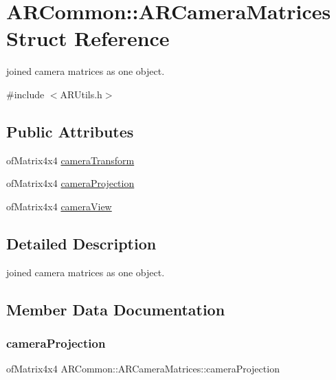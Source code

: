 \hypertarget{struct_a_r_common_1_1_a_r_camera_matrices}{}\section{A\+R\+Common\+:\+:A\+R\+Camera\+Matrices Struct Reference}
\label{struct_a_r_common_1_1_a_r_camera_matrices}


joined camera matrices as one object.  




{\ttfamily \#include $<$A\+R\+Utils.\+h$>$}

\subsection*{Public Attributes}
\begin{DoxyCompactItemize}
\item 
of\+Matrix4x4 \hyperlink{struct_a_r_common_1_1_a_r_camera_matrices_a704028e138238522f8e060d5d587b0ef}{camera\+Transform}
\item 
of\+Matrix4x4 \hyperlink{struct_a_r_common_1_1_a_r_camera_matrices_a5d0957360e888d95ae75358416dfe487}{camera\+Projection}
\item 
of\+Matrix4x4 \hyperlink{struct_a_r_common_1_1_a_r_camera_matrices_a0a6b9d23ece063831aac56c704d83d7f}{camera\+View}
\end{DoxyCompactItemize}


\subsection{Detailed Description}
joined camera matrices as one object. 

\subsection{Member Data Documentation}
\mbox{\label{struct_a_r_common_1_1_a_r_camera_matrices_a5d0957360e888d95ae75358416dfe487}} 
\subsubsection{\texorpdfstring{camera\+Projection}{cameraProjection}}
{\footnotesize\ttfamily of\+Matrix4x4 A\+R\+Common\+::\+A\+R\+Camera\+Matrices\+::camera\+Projection}

